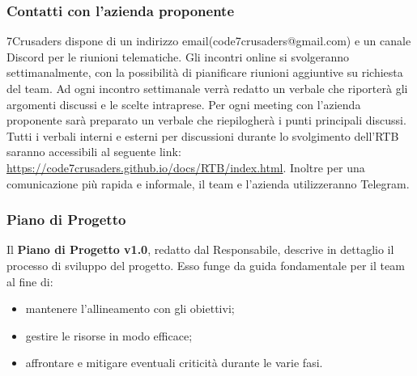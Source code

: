 \subsubsection{Contatti con l’azienda proponente}
7Crusaders dispone di un indirizzo email(code7crusaders@gmail.com) e un canale Discord per le riunioni telematiche. 
Gli incontri online si svolgeranno settimanalmente, con la possibilità di pianificare riunioni aggiuntive su richiesta del team.
Ad ogni incontro settimanale verrà redatto un verbale che riporterà gli argomenti discussi e le scelte intraprese.
Per ogni meeting con l’azienda proponente sarà preparato un verbale che riepilogherà i punti principali discussi. 
Tutti i verbali interni e esterni per discussioni durante lo svolgimento dell'RTB saranno accessibili al seguente link: \url{https://code7crusaders.github.io/docs/RTB/index.html}.
Inoltre per una comunicazione più rapida e informale, il team e l'azienda utilizzeranno Telegram.



\subsubsection{Piano di Progetto}
Il \textbf{Piano di Progetto v1.0}, redatto dal Responsabile, descrive in dettaglio il processo di sviluppo del progetto. Esso funge da guida fondamentale per il team al fine di:
\begin{itemize}
    \item mantenere l’allineamento con gli obiettivi;
    \item gestire le risorse in modo efficace;
    \item affrontare e mitigare eventuali criticità durante le varie fasi.
\end{itemize}

